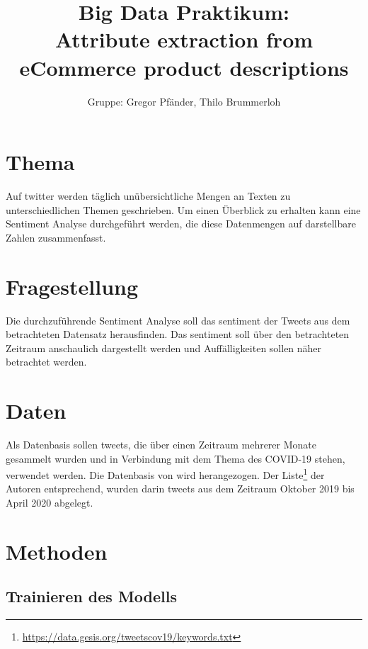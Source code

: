 \documentclass[paper=a4,12pt,listof=totoc]{scrartcl}%
\title{Big Data Praktikum: \\ Attribute extraction from eCommerce product descriptions}
\author{Gruppe: Gregor Pfänder, Thilo Brummerloh}
\begin{document}
	\maketitle
	
	\section{Thema}
	Auf twitter werden täglich unübersichtliche Mengen an Texten zu unterschiedlichen Themen geschrieben. Um einen Überblick zu erhalten kann eine Sentiment Analyse durchgeführt werden, die diese Datenmengen auf darstellbare Zahlen zusammenfasst.
	
	\section{Fragestellung}
	Die durchzuführende Sentiment Analyse soll das sentiment der Tweets aus dem betrachteten Datensatz herausfinden. Das sentiment soll über den betrachteten Zeitraum anschaulich dargestellt werden und Auffälligkeiten sollen näher betrachtet werden. 
	
	\section{Daten}
	Als Datenbasis sollen tweets, die über einen Zeitraum mehrerer Monate gesammelt wurden und in Verbindung mit dem Thema des COVID-19 stehen, verwendet werden.
	Die Datenbasis von \cite{erdal_baran} wird herangezogen. Der Liste\footnote{\href{https://data.gesis.org/tweetscov19/keywords.txt}{https://data.gesis.org/tweetscov19/keywords.txt}} der Autoren entsprechend, wurden darin tweets aus dem Zeitraum Oktober 2019 bis April 2020 abgelegt. 
	
	\section{Methoden}
	\subsection{Trainieren des Modells}
	
	
	\printbibliography[title=Literaturverzeichnis]
\end{document}
